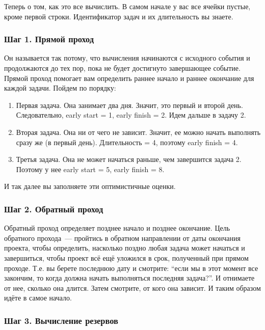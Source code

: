\documentclass{../../text-style}
\begin{document}
Теперь о том, как это все вычислить. В самом начале у вас все ячейки пустые, кроме первой строки. Идентификатор задач и их длительность вы знаете.

\subsubsection{Шаг 1. Прямой проход}

Он называется так потому, что вычисления начинаются с исходного события и продолжаются до тех пор, пока не будет достигнуто завершающее событие. Прямой проход помогает вам определить раннее начало и раннее окончание для каждой задачи. Пойдем по порядку:

\begin{enumerate}
    \item Первая задача. Она занимает два дня. Значит, это первый и второй день. Следовательно, early start = 1, early finish = 2. Идем дальше в задачу 2.
    \item Вторая задача. Она ни от чего не зависит. Значит, ее можно начать выполнять сразу же (в первый день). Длительность = 4, поэтому early finish = 4.
    \item Третья задача. Она не может начаться раньше, чем завершится задача 2. Поэтому у нее early start = 5, early finish = 8.
\end{enumerate}

И так далее вы заполняете эти оптимистичные оценки.

\subsubsection{Шаг 2. Обратный проход}

Обратный проход  определяет позднее начало и позднее окончание. Цель обратного прохода~--- пройтись в обратном направлении от даты окончания проекта, чтобы определить, насколько поздно любая задача может начаться и завершиться, чтобы проект всё ещё уложился в срок, полученный при прямом проходе. Т.е. вы берете последнюю дату и смотрите: \enquote{если мы в этот момент все закончим, то когда должна начать выполняться последняя задача?}. И отнимаете от нее, сколько она длится. Затем смотрите, от кого она зависит. И таким образом идёте в самое начало. 

\subsubsection{Шаг 3. Вычисление резервов}
\end{document}
